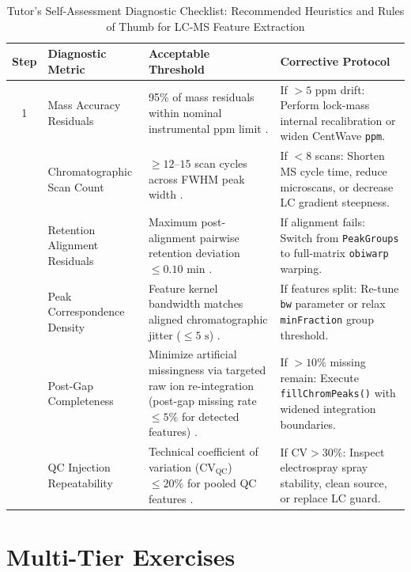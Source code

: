 \documentclass[11pt,twoside,openright]{book}
\begin{document}
\begin{table}[ht]
\centering
\caption{Tutor's Self-Assessment Diagnostic Checklist: Recommended Heuristics and Rules of Thumb for LC-MS Feature Extraction}
\label{tab:feature_checklist}
\small
\begin{tabularx}{\textwidth}{c p{3.8cm} p{4.2cm} X}
\toprule
\textbf{Step} & \textbf{Diagnostic Metric} & \textbf{Acceptable Threshold} & \textbf{Corrective Protocol} \\
\midrule
1 & Mass Accuracy Residuals & 95\% of mass residuals within nominal instrumental ppm limit \cite{tautenhahn2008highly}. & If $>5\text{ ppm}$ drift: Perform lock-mass internal recalibration or widen CentWave \texttt{ppm}. \\
\addlinespace
2 & Chromatographic Scan Count & $\ge 12$--$15$ scan cycles across FWHM peak width \cite{broadhurst2018guidelines}. & If $<8$ scans: Shorten MS cycle time, reduce microscans, or decrease LC gradient steepness. \\
\addlinespace
3 & Retention Alignment Residuals & Maximum post-alignment pairwise retention deviation $\le 0.10$ min \cite{prince2006chromatographic}. & If alignment fails: Switch from \texttt{PeakGroups} to full-matrix \texttt{obiwarp} warping. \\
\addlinespace
4 & Peak Correspondence Density & Feature kernel bandwidth matches aligned chromatographic jitter ($\le 5\text{ s}$) \cite{smith2006xcms}. & If features split: Re-tune \texttt{bw} parameter or relax \texttt{minFraction} group threshold. \\
\addlinespace
5 & Post-Gap Completeness & Minimize artificial missingness via targeted raw ion re-integration (post-gap missing rate $\le 5\%$ for detected features) \cite{benton2015evaluating}. & If $>10\%$ missing remain: Execute \texttt{fillChromPeaks()} with widened integration boundaries. \\
\addlinespace
6 & QC Injection Repeatability & Technical coefficient of variation ($\text{CV}_{\text{QC}}$) $\le 20\%$ for pooled QC features \cite{dunn2011mass}. & If $\text{CV} > 30\%$: Inspect electrospray spray stability, clean source, or replace LC guard. \\
\bottomrule
\end{tabularx}
\end{table}

\section{Multi-Tier Exercises}
\end{document}
